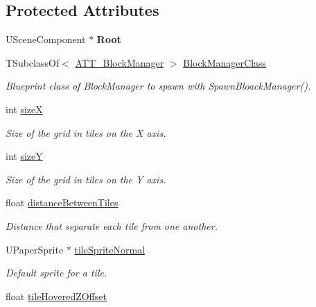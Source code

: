 \subsection*{Protected Attributes}
\begin{DoxyCompactItemize}
\item 
\mbox{\label{class_a_t_t___grid_manager_a46566a931492e920d15b0598970124d1}} 
U\+Scene\+Component $\ast$ {\bfseries Root}
\item 
T\+Subclass\+Of$<$ \mbox{\hyperlink{class_a_t_t___block_manager}{A\+T\+T\+\_\+\+Block\+Manager}} $>$ \mbox{\hyperlink{class_a_t_t___grid_manager_afc01cb2845f708bd5f7d5c957396a8c4}{Block\+Manager\+Class}}
\begin{DoxyCompactList}\small\item\em Blueprint class of Block\+Manager to spawn with Spawn\+Bloack\+Manager(). \end{DoxyCompactList}\item 
int \mbox{\hyperlink{class_a_t_t___grid_manager_aff731d4ed219d936d3df519f6dcf26e4}{sizeX}}
\begin{DoxyCompactList}\small\item\em Size of the grid in tiles on the X axis. \end{DoxyCompactList}\item 
int \mbox{\hyperlink{class_a_t_t___grid_manager_a76649cfa84681fd01e10dc0b5de9717a}{sizeY}}
\begin{DoxyCompactList}\small\item\em Size of the grid in tiles on the Y axis. \end{DoxyCompactList}\item 
float \mbox{\hyperlink{class_a_t_t___grid_manager_a0c71cee44077741507626b57002b5c40}{distance\+Between\+Tiles}}
\begin{DoxyCompactList}\small\item\em Distance that separate each tile from one another. \end{DoxyCompactList}\item 
U\+Paper\+Sprite $\ast$ \mbox{\hyperlink{class_a_t_t___grid_manager_a2d63415b034d3f4955f73796a51f7155}{tile\+Sprite\+Normal}}
\begin{DoxyCompactList}\small\item\em Default sprite for a tile. \end{DoxyCompactList}\item 
float \mbox{\hyperlink{class_a_t_t___grid_manager_a017d3614b518aa1ab7560753dc0b7f35}{tile\+Hovered\+Z\+Offset}}

\end{DoxyCompactItemize}
